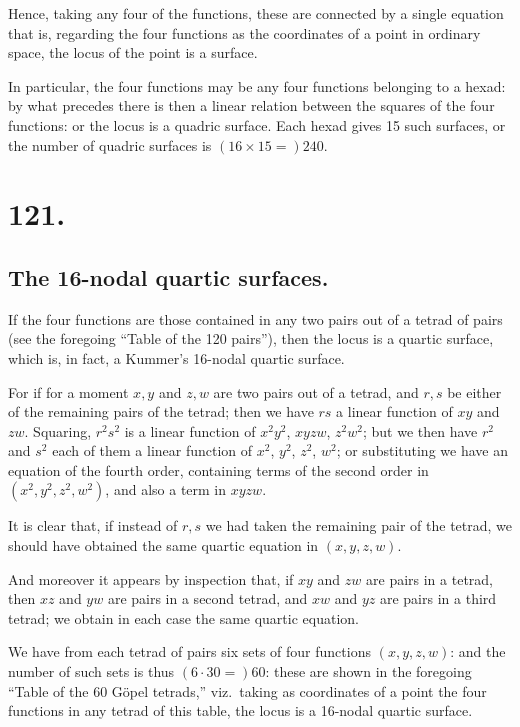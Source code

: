 \documentclass[11pt,a4paper]{article}
\begin{document}
Hence, taking any four of the functions, these are connected by a single equation that is, regarding the four functions as the coordinates of a point in ordinary space, the locus of the point is a surface.

In particular, the four functions may be any four functions belonging to a hexad: by what precedes there is then a linear relation between the squares of the four functions: or the locus is a quadric surface. Each hexad gives 15 such surfaces, or the number of quadric surfaces is $(16 \times 15 =) 240$.

\newpage
\section*{121.}
\label{sec:121}

\subsection*{The 16-nodal quartic surfaces.}

If the four functions are those contained in any two pairs out of a tetrad of pairs (see the foregoing ``Table of the 120 pairs''), then the locus is a quartic surface, which is, in fact, a Kummer's 16-nodal quartic surface.

For if for a moment $x,y$ and $z,w$ are two pairs out of a tetrad, and $r,s$ be either of the remaining pairs of the tetrad; then we have $rs$ a linear function of $xy$ and $zw$. Squaring, $r^2s^2$ is a linear function of $x^2y^2$, $xyzw$, $z^2w^2$; but we then have $r^2$ and $s^2$ each of them a linear function of $x^2$, $y^2$, $z^2$, $w^2$; or substituting we have an equation of the fourth order, containing terms of the second order in $(x^2, y^2, z^2, w^2)$, and also a term in $xyzw$.

It is clear that, if instead of $r,s$ we had taken the remaining pair of the tetrad, we should have obtained the same quartic equation in $(x, y, z, w)$.

And moreover it appears by inspection that, if $xy$ and $zw$ are pairs in a tetrad, then $xz$ and $yw$ are pairs in a second tetrad, and $xw$ and $yz$ are pairs in a third tetrad; we obtain in each case the same quartic equation.

We have from each tetrad of pairs six sets of four functions $(x, y, z, w)$: and the number of such sets is thus $(6 \cdot 30 =) 60$: these are shown in the foregoing ``Table of the 60 G\"{o}pel tetrads,'' viz.\ taking as coordinates of a point the four functions in any tetrad of this table, the locus is a 16-nodal quartic surface.
\end{document}
